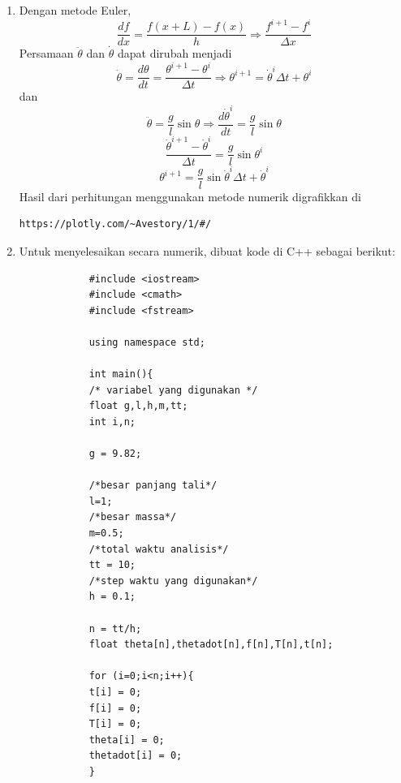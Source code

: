 \documentclass[12pt]{article}
\begin{document}
\begin{enumerate}[label=(\alph*)]
			\item Dengan metode Euler,
			\begin{equation}
			\dfrac{df}{dx}= \dfrac{f(x+L)-f(x)}{h} \Rightarrow \dfrac{f^{i+1}-f^i}{\Delta x}
			\end{equation}
			Persamaan $\ddot{\theta}$ dan $\dot{\theta}$ dapat dirubah menjadi
		\begin{equation}
			\dot{\theta}=\dfrac{d\theta}{dt}=  \dfrac{\theta^{i+1}-\theta^i}{\Delta t} \Rightarrow \theta^{i+1} = \dot{\theta}^i\Delta t+ \theta^i
			\end{equation}
			dan
			\begin{equation}
			\ddot{\theta}=\dfrac{g}{l} \sin \theta \Rightarrow  \dfrac{d\dot{\theta}^i}{dt} =  \dfrac{g}{l} \sin \theta
			\end{equation}
			\begin{equation}
		 \dfrac{\dot{\theta}^{i+1}-\dot{\theta}^i}{\Delta t} = \dfrac{g}{l} \sin \theta^{i} 
			\end{equation}
			\begin{equation}
			\theta^{i+1}=\dfrac{g}{l} \sin \dot{\theta}^{i}\Delta t+\dot{\theta}^i 
			\end{equation}
			Hasil dari perhitungan menggunakan metode numerik digrafikkan di 			\begin{verbatim}https://plotly.com/~Avestory/1/#/
			\end{verbatim}
			
			\item 
			Untuk menyelesaikan secara numerik, dibuat kode di C++ sebagai berikut:
			\begin{verbatim}
			#include <iostream>
			#include <cmath>
			#include <fstream>
			
			using namespace std;
			
			int main(){
			/* variabel yang digunakan */
			float g,l,h,m,tt;
			int i,n;
			
			g = 9.82;
			
			/*besar panjang tali*/
			l=1;
			/*besar massa*/
			m=0.5;
			/*total waktu analisis*/
			tt = 10;
			/*step waktu yang digunakan*/
			h = 0.1;
			
			n = tt/h;
			float theta[n],thetadot[n],f[n],T[n],t[n];
			
			for (i=0;i<n;i++){
			t[i] = 0;
			f[i] = 0;
			T[i] = 0;
			theta[i] = 0;
			thetadot[i] = 0;
			}
			

\end{verbatim}
\end{enumerate}
\end{document}
